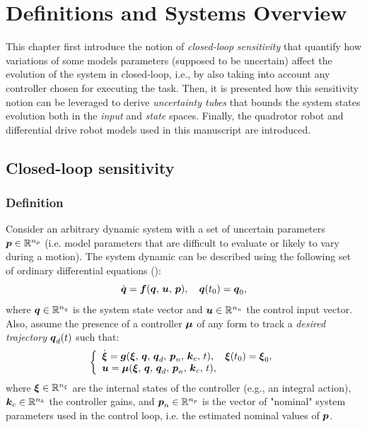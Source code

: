 \chapter{Definitions and Systems Overview}

This chapter first introduce the notion of \emph{closed-loop sensitivity} that quantify how variations of some models parameters (supposed to be uncertain) affect the evolution of the system in closed-loop, i.e., by also taking into account any controller chosen for executing the task.
Then, it is presented how this sensitivity notion can be leveraged to derive \emph{uncertainty tubes} that bounds the system states evolution both in the \emph{input} and \emph{state} spaces.
Finally, the quadrotor robot and differential drive robot models used in this manuscript are introduced.

\section{Closed-loop sensitivity}
\subsection{Definition}\label{sec:sensi}

Consider an arbitrary dynamic system with a set of uncertain parameters $\boldsymbol{p} \in \mathbb{R}^{n_p}$ (i.e. model parameters that are difficult to evaluate or likely to vary during a motion).
The system dynamic can be described using the following set of ordinary differential equations ():
\begin{equation}\label{eq:dyna}
    \dot{\boldsymbol{q}}=\boldsymbol{f}(\boldsymbol{q},\,\boldsymbol{u},\,\boldsymbol{p}), \quad \boldsymbol{q}(t_0)=\boldsymbol{q}_{0},
\end{equation}
where $\boldsymbol{q}\in \mathbb{R}^{n_{q}}$ is the system state vector and $\boldsymbol{u}\in \mathbb{R}^{n_{u}}$ the control input vector.
Also, assume the presence of a controller $\boldsymbol{\mu}$ of any form to track a \emph{desired trajectory} $\boldsymbol{q}_d(t)$ such that:
\begin{equation}\label{eq:ctrl}
     \left \{
     \begin{array}{l l}
          \dot{\boldsymbol{\xi}} = \boldsymbol{g}(\boldsymbol{\xi},\,\boldsymbol{q},\,\boldsymbol{q}_d,\,\boldsymbol{p}_n,\,\boldsymbol{k}_c,\,t), \quad \boldsymbol{\xi}(t_0)=\boldsymbol{\xi}_{0}, \\
          \boldsymbol{u}=\boldsymbol{\mu}(\boldsymbol{\xi},\,\boldsymbol{q},\,\boldsymbol{q}_d,\,\boldsymbol{p}_n,\,\boldsymbol{k}_c,\,t), 
   \end{array} 
   \right .
\end{equation}
where $\boldsymbol{\xi}\in \mathbb{R}^{n_{\xi}}$ are the internal states of the controller (e.g., an integral action), $\boldsymbol{k}_{c}\in \mathbb{R}^{n_{k}}$ the controller gains, and $\boldsymbol{p}_{n}\in{\mathbb{R}^{n_{p}}}$ is the vector of "nominal" system parameters used in the control loop, i.e. the estimated nominal values of $\boldsymbol{p}$.

